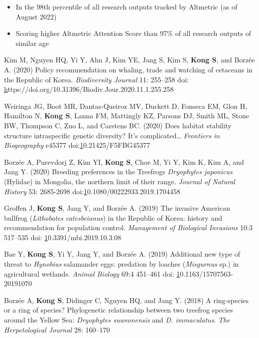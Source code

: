 \documentclass[11pt]{article}
\begin{document}
\begin{etaremune}
	\begin{itemize}\item In the 98th percentile of all research outputs tracked by Altmetric (as of August 2022)
				\item Scoring higher Altmetric Attention Score than 97\% of all research outputs of similar age \end{itemize}
	
\item Kim M, Nguyen HQ, Yi Y, Ahn J, Kim YE, Jang S, Kim S, \textbf{Kong S}, and Borzée A. (2020) Policy recommendation on whaling, trade and watching of cetaceans in the Republic of Korea. \textit{Biodiversity Journal} 11: 255–258 doi: \href{https://doi.org/10.31396/Biodiv.Jour.2020.11.1.255.258}https://doi.org/10.31396/Biodiv.Jour.2020.11.1.255.258
\item Weiringa JG, Boot MR,  Dantas-Queiroz MV, Duckett D, Fonseca EM, Glon H, Hamilton N, \textbf{Kong S}, Lanna FM, Mattingly KZ, Parsons DJ, Smith ML, Stone BW, Thompson C, Zuo L, and Carstens BC. (2020) Does habitat stability structure intraspecific genetic diversity? It’s complicated… \textit{Frontiers in Biogeography} e45377 doi:\href{https://doi.org/10.21425/F5FBG45377}10.21425/F5FBG45377
\item Borzée A, Purevdorj Z, Kim YI, \textbf{Kong S}, Choe M, Yi Y, Kim K, Kim A, and Jang Y. (2020) Breeding preferences in the Treefrogs \textit{Dryophytes japonicus} (Hylidae) in Mongolia, the northern limit of their range. \textit{Journal of Natural History} 53: 2685-2698 doi:\href{10.1080/00222933.2019.1704458}10.1080/00222933.2019.1704458
\item Groffen J, \textbf{Kong S}, Jang Y, and Borzée A. (2019) The invasive American bullfrog (\textit{Lithobates catesbeianus}) in the Republic of Korea: history and recommendation for population control. \textit{Management of Biological Invasions} 10:3 517–535 doi: \href{10.3391/mbi.2019.10.3.08}10.3391/mbi.2019.10.3.08
\item Bae Y, \textbf{Kong S}, Yi Y, Jang Y, and Borzée A. (2019) Additional new type of threat to \textit{Hynobius} salamander eggs: predation by loaches (\textit{Misgurnus} sp.) in agricultural wetlands. \textit{Animal Biology} 69:4 451–461 doi: \href{https://doi.org/10.1163/15707563-20191070}10.1163/15707563-20191070
\item Borzée A,\textbf{ Kong S}, Didinger C, Nguyen HQ, and Jang Y. (2018) A ring-species or a ring of species? Phylogenetic relationship between two treefrog species around the Yellow Sea: \textit{Dryophytes suweonensis }and \textit{D. immaculatus}. \textit{The Herpetological Journal} 28: 160–170 

\end{etaremune}
\end{document}
